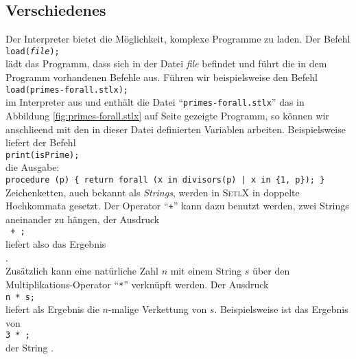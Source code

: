 \subsection{Verschiedenes}
Der Interpreter bietet die M\"{o}glichkeit, komplexe Programme zu laden.  Der Befehl
\\[0.2cm]
\hspace*{1.3cm}
\texttt{load(\textsl{file});}
\\[0.2cm]
l\"{a}dt das Programm, dass sich in der Datei \textsl{file} befindet und f\"{u}hrt die in dem
Programm vorhandenen Befehle aus.  F\"{u}hren wir beispielsweise den Befehl
\\[0.2cm]
\hspace*{1.3cm}
\texttt{load(primes-forall.stlx);}
\\[0.2cm]
im Interpreter aus und enth\"{a}lt die Datei ``\texttt{primes-forall.stlx}'' das in Abbildung
\ref{fig:primes-forall.stlx} auf Seite \pageref{fig:primes-forall.stlx} gezeigte Programm,
so k\"{o}nnen wir anschlie\3end mit den in dieser Datei definierten Variablen arbeiten.
Beispielsweise liefert der Befehl
\\[0.2cm]
\hspace*{1.3cm}
\texttt{print(isPrime);}
\\[0.2cm]
die Ausgabe:
\\[0.2cm]
\hspace*{1.3cm}
\texttt{procedure (p) \{ return forall (x in divisors(p) | x in \{1, p\}); \}}
\\[0.2cm]
Zeichenketten, auch bekannt als \emph{Strings}, werden in \textsc{SetlX} in doppelte
Hochkommata gesetzt.  Der Operator ``\texttt{+}'' kann dazu benutzt werden, zwei Strings
aneinander zu h\"{a}ngen, der Ausdruck 
\\[0.2cm]
\hspace*{1.3cm}
\texttt{ + ;}
\\[0.2cm]
liefert also das Ergebnis
\\[0.2cm]
\hspace*{1.3cm}
.
\\[0.2cm]
Zus\"{a}tzlich kann eine nat\"{u}rliche Zahl $n$ mit einem String $s$ \"{u}ber den
Multiplikations-Operator ``\texttt{*}'' verkn\"{u}pft werden.  Der Ausdruck 
\\[0.2cm]
\hspace*{1.3cm}
\texttt{n * s;}
\\[0.2cm]
liefert als Ergebnis die $n$-malige Verkettung von $s$.  Beispielsweise ist das Ergebnis von
\\[0.2cm]
\hspace*{1.3cm}
\texttt{3 * ;}
\\[0.2cm]
der String .

